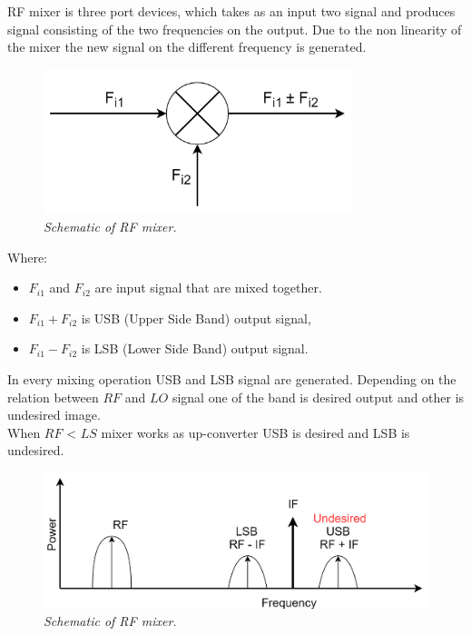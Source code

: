 \documentclass[en,printmode]{mgr}
\begin{document}
		RF mixer is three port devices, which takes as an input two signal and produces signal consisting of 
		the two frequencies on the output. Due to the non linearity of the mixer the new signal on the different
		frequency is generated. \cite{mix} 
		
		\begin{figure}[!htb]
    		\centering
   			\includegraphics[width=0.8\textwidth]{diag/mixer.png}
    		\caption{\textit{Schematic of RF mixer.}}
		\end{figure}
		
		Where:
		\begin{itemize}
			\item $F_{i1}$ and $F_{i2}$ are input signal that are mixed together.
			\item $F_{i1} + F_{i2}$ is USB (Upper Side Band) output signal,
			\item $F_{i1} - F_{i2}$ is LSB (Lower Side Band) output signal.
		\end{itemize}
		
		In every mixing operation USB and LSB signal are generated. Depending on the relation between $RF$ and $LO$
		signal one of the band is desired output and other is undesired image.
		\\
		
		When $RF$ < $LS$ mixer works as up-converter USB is desired and LSB is undesired.
		\begin{figure}[!htb]
    		\centering
   			\includegraphics[width=\textwidth]{diag/upconv.png}
    		\caption{\textit{Schematic of RF mixer.}}
		\end{figure}
		
\end{document}

